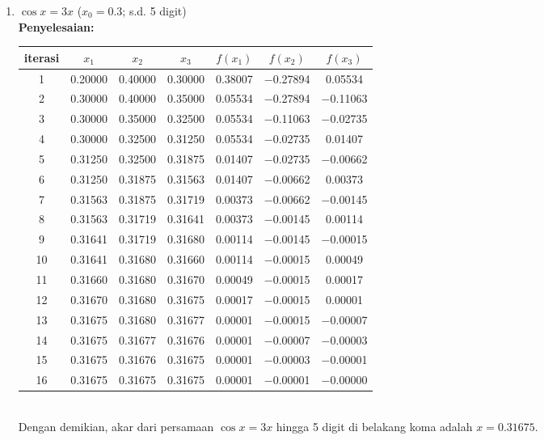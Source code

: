 \documentclass{article}
\newcommand{\penyelesaian}{\textbf{Penyelesaian: }}
\begin{document}
\begin{enumerate}
\begin{enumerate}
        \item $\cos{x} = 3x$ ($x_0 = \num{0,3}$; s.d. 5 digit) \\
        \penyelesaian \\
        \begin{tabular}{|c|c|c|c|c|c|c|}
            \hline
            iterasi & $x_1$ & $x_2$ & $x_3$ & $f(x_1)$ & $f(x_2)$ & $f(x_3)$ \\
            \hline
            1 & \num{0,20000} & \num{0,40000} & \num{0,30000} & \num{0,38007} & \num{-0,27894} & \num{0,05534}\\
            2 & \num{0,30000} & \num{0,40000} & \num{0,35000} & \num{0,05534} & \num{-0,27894} & \num{-0,11063}\\
            3 & \num{0,30000} & \num{0,35000} & \num{0,32500} & \num{0,05534} & \num{-0,11063} & \num{-0,02735}\\
            4 & \num{0,30000} & \num{0,32500} & \num{0,31250} & \num{0,05534} & \num{-0,02735} & \num{0,01407}\\
            5 & \num{0,31250} & \num{0,32500} & \num{0,31875} & \num{0,01407} & \num{-0,02735} & \num{-0,00662}\\
            6 & \num{0,31250} & \num{0,31875} & \num{0,31563} & \num{0,01407} & \num{-0,00662} & \num{0,00373}\\
            7 & \num{0,31563} & \num{0,31875} & \num{0,31719} & \num{0,00373} & \num{-0,00662} & \num{-0,00145}\\
            8 & \num{0,31563} & \num{0,31719} & \num{0,31641} & \num{0,00373} & \num{-0,00145} & \num{0,00114}\\
            9 & \num{0,31641} & \num{0,31719} & \num{0,31680} & \num{0,00114} & \num{-0,00145} & \num{-0,00015}\\
            10 & \num{0,31641} & \num{0,31680} & \num{0,31660} & \num{0,00114} & \num{-0,00015} & \num{0,00049}\\
            11 & \num{0,31660} & \num{0,31680} & \num{0,31670} & \num{0,00049} & \num{-0,00015} & \num{0,00017}\\
            12 & \num{0,31670} & \num{0,31680} & \num{0,31675} & \num{0,00017} & \num{-0,00015} & \num{0,00001}\\
            13 & \num{0,31675} & \num{0,31680} & \num{0,31677} & \num{0,00001} & \num{-0,00015} & \num{-0,00007}\\
            14 & \num{0,31675} & \num{0,31677} & \num{0,31676} & \num{0,00001} & \num{-0,00007} & \num{-0,00003}\\
            15 & \num{0,31675} & \num{0,31676} & \num{0,31675} & \num{0,00001} & \num{-0,00003} & \num{-0,00001}\\
            16 & \num{0,31675} & \num{0,31675} & \num{0,31675} & \num{0,00001} & \num{-0,00001} & \num{-0,00000}\\
             \hline
            \end{tabular} \\                     
        Dengan demikian, akar dari persamaan $\cos{x} = 3x$ hingga 5 digit di belakang koma adalah $x = \num{0,31675}$.


\end{enumerate}
\end{enumerate}
\end{document}
